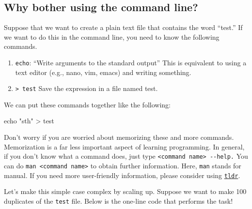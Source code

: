 \documentclass[
  letterpaper,
  DIV=11,
  numbers=noendperiod]{scrreprt}
\newenvironment{Shaded}{\begin{snugshade}}{\end{snugshade}}
\newcommand{\BuiltInTok}[1]{\textcolor[rgb]{0.00,0.23,0.31}{#1}}
\newcommand{\ControlFlowTok}[1]{\textcolor[rgb]{0.00,0.23,0.31}{#1}}
\newcommand{\DataTypeTok}[1]{\textcolor[rgb]{0.68,0.00,0.00}{#1}}
\newcommand{\DecValTok}[1]{\textcolor[rgb]{0.68,0.00,0.00}{#1}}
\newcommand{\FunctionTok}[1]{\textcolor[rgb]{0.28,0.35,0.67}{#1}}
\newcommand{\KeywordTok}[1]{\textcolor[rgb]{0.00,0.23,0.31}{#1}}
\newcommand{\NormalTok}[1]{\textcolor[rgb]{0.00,0.23,0.31}{#1}}
\newcommand{\OperatorTok}[1]{\textcolor[rgb]{0.37,0.37,0.37}{#1}}
\newcommand{\StringTok}[1]{\textcolor[rgb]{0.13,0.47,0.30}{#1}}
\newcommand{\VariableTok}[1]{\textcolor[rgb]{0.07,0.07,0.07}{#1}}
\providecommand{\tightlist}{%
  \setlength{\itemsep}{0pt}\setlength{\parskip}{0pt}}\usepackage{longtable,booktabs,array}
\begin{document}
\hypertarget{why-bother-using-the-command-line}{%
\subsection*{Why bother using the command
line?}\label{why-bother-using-the-command-line}}

Suppose that we want to create a plain text file that contains the word
``test.'' If we want to do this in the command line, you need to know
the following commands.

\begin{enumerate}
\def\labelenumi{\arabic{enumi}.}
\tightlist
\item
  \texttt{echo}: ``Write arguments to the standard output'' This is
  equivalent to using a text editor (e.g., nano, vim, emacs) and writing
  something.
\item
  \texttt{\textgreater{}\ test} Save the expression in a file named
  test.
\end{enumerate}

We can put these commands together like the following:

\begin{Shaded}
\begin{Highlighting}[]
\BuiltInTok{echo} \StringTok{"sth"} \OperatorTok{\textgreater{}}\NormalTok{ test }
\end{Highlighting}
\end{Shaded}

Don't worry if you are worried about memorizing these and more commands.
Memorization is a far less important aspect of learning programming. In
general, if you don't know what a command does, just type
\texttt{\textless{}command\ name\textgreater{}\ -\/-help.} You can do
\texttt{man\ \textless{}command\ name\textgreater{}} to obtain further
information. Here, \texttt{man} stands for manual. If you need more
user-friendly information, please consider using
\href{https://tldr.sh/}{\texttt{tldr}}.

Let's make this simple case complex by scaling up. Suppose we want to
make 100 duplicates of the \texttt{test} file. Below is the one-line
code that performs the task!

\begin{Shaded}
\end{Shaded}
\end{document}
